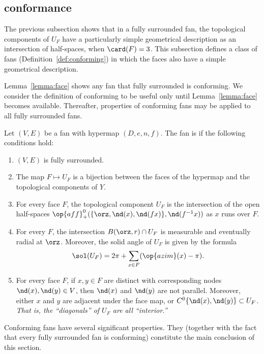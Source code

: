 \subsection{conformance}\label{sec:conformance}


The previous subsection shows that in a fully surrounded fan, the topological
components of $U_F$ have a particularly simple geometrical description as
an intersection of half-spaces, when $\card(F)=3$.  This subsection defines
a class of fans (Definition~\ref{def:conforming}) in which the faces also have
a  simple geometrical description.

Lemma~\ref{lemma:face} shows any fan that fully surrounded is
conforming.  We consider the definition of conforming to be
useful only until Lemma~\ref{lemma:face} becomes available.
Thereafter, properties of conforming fans may be applied to all fully
surrounded fans.

\begin{definition}[conforming]\label{def:conforming}
Let $(V,E)$ be a fan with hypermap $(D,e,n,f)$.  The fan is
 if the following conditions hold:
\begin{enumerate}
\item {} $(V,E)$ is fully surrounded.
\item {} The map $F\mapsto U_F$ is a bijection between
the faces of the hypermap and the topological components of $Y$.
\item {} For every face $F$, the topological component
$U_F$ is the intersection of the open half-spaces
$\op{aff}_+^0(\{\orz,\nd(x),\nd({f x})\},\nd(f^{-1} x))$ as $x$ runs over
$F$.
\item {} For every $F$, the intersection
$B(\orz,r)\cap U_F$ is measurable and eventually radial at $\orz$.
Moreover, the solid angle of $U_F$ is given by the formula
\[ 
\sol(U_F) = 2\pi + \sum_{x\in F}(\op{azim}(x)-\pi).
\] 
\item {} For every face $F$, if $x,y\in F$ are distinct
with corresponding nodes $\nd(x),\nd(y)\in V$, then $\nd(x)$ and
$\nd(y)$ are not parallel.  Moreover, either $x$ and $y$ are adjacent under
the face map, or $C^0\{\nd(x),\nd(y)\}\subset U_F$.  {\it That is, the
``diagonals'' of $U_F$ are all ``interior.''}
\end{enumerate}
\end{definition}


Conforming fans have several significant properties.   They
(together with the fact that every fully surrounded fan is conforming) constitute
the main conclusion of this section.  

